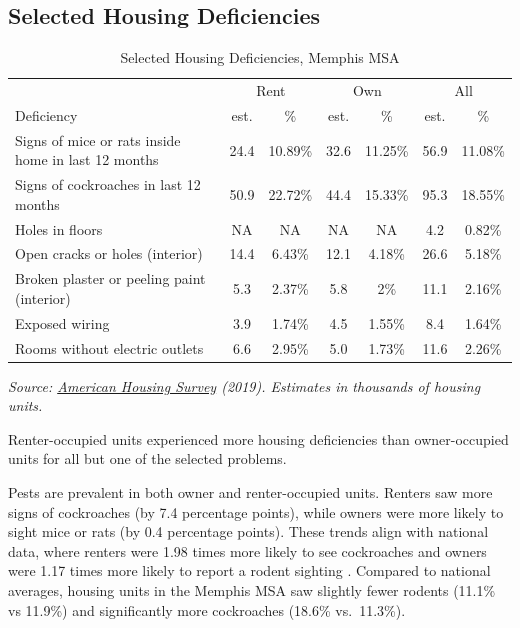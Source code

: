\documentclass[
]{book}
\begin{document}
\hypertarget{selected-housing-deficiencies}{%
\subsection{Selected Housing Deficiencies}\label{selected-housing-deficiencies}}

\begin{table}

\caption{\label{tab:tbl-AHSselfdef}Selected Housing Deficiencies, Memphis MSA}
\centering
\begin{tabular}[t]{l|c|c|c|c|c|c}
\hline
\multicolumn{1}{c|}{ } & \multicolumn{2}{c|}{Rent} & \multicolumn{2}{c|}{Own} & \multicolumn{2}{c}{All} \\
\cline{2-3} \cline{4-5} \cline{6-7}
Deficiency & est. & \% & est. & \% & est. & \%\\
\hline
Signs of mice or rats inside home in last 12 months & 24.4 & 10.89\% & 32.6 & 11.25\% & 56.9 & 11.08\%\\
\hline
Signs of cockroaches in last 12 months & 50.9 & 22.72\% & 44.4 & 15.33\% & 95.3 & 18.55\%\\
\hline
Holes in floors & NA & NA & NA & NA & 4.2 & 0.82\%\\
\hline
Open cracks or holes (interior) & 14.4 & 6.43\% & 12.1 & 4.18\% & 26.6 & 5.18\%\\
\hline
Broken plaster or peeling paint (interior) & 5.3 & 2.37\% & 5.8 & 2\% & 11.1 & 2.16\%\\
\hline
Exposed wiring & 3.9 & 1.74\% & 4.5 & 1.55\% & 8.4 & 1.64\%\\
\hline
Rooms without electric outlets & 6.6 & 2.95\% & 5.0 & 1.73\% & 11.6 & 2.26\%\\
\hline
\end{tabular}
\end{table}

\emph{Source: \href{https://www.census.gov/newsroom/press-releases/2020/2019-american-housing-survey.html}{American Housing Survey} (2019). Estimates in thousands of housing units.}

Renter-occupied units experienced more housing deficiencies than owner-occupied units for all but one of the selected problems.

Pests are prevalent in both owner and renter-occupied units. Renters saw more signs of cockroaches (by 7.4 percentage points), while owners were more likely to sight mice or rats (by 0.4 percentage points). These trends align with national data, where renters were 1.98 times more likely to see cockroaches and owners were 1.17 times more likely to report a rodent sighting \citep{sellner2021}. Compared to national averages, housing units in the Memphis MSA saw slightly fewer rodents (11.1\% vs 11.9\%) and significantly more cockroaches (18.6\% vs.~11.3\%).
\end{document}
